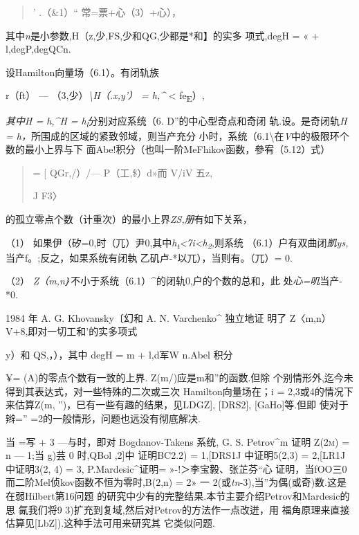 \documentclass{article}
\begin{document}
\begin{quote}
' .（\&1）`` 常=票+心（3）+心），
\end{quote}

其中\emph{n}是小参数,H（z,少,FS,少和QG,少都是*和】的实多 项式,degH = « +
l,degP,degQCn.

设Hamilton向量场（6.1）。有闭轨族

r（ft） --- （3,少）\emph{\textbackslash{}H（.x,y'） = h,\^{}}
\textless{} fe\textsubscript{E}）,

\emph{其中H = h,\^{}H = h\textsubscript{l}}分别对应系统（6.
D''的中心型奇点和奇闭 轨.设。是奇闭轨\emph{H =
h，}所围成的区域的紧致邻域，则当产充分
小时，系统（6.1\textbackslash{}在\emph{V}中的极限环个数的最小上界与下
面Abe!积分（也叫一阶MeFhikov函数，參宥（5.12）式）

\begin{quote}
= {[} QGr,/）/--- P（工,\$）d»而 V/iV 五z,

J F3〉
\end{quote}

的孤立零点个数（计重次）的最小上界\emph{ZS,册}有如下关系，

（1）
如果伊（矽=0,时（兀）尹0,其中\emph{h\textsubscript{t}\textless{}7i\textless{}h\textsubscript{2},}则系统
（6.1）户有双曲闭\emph{凱ys,}当产f。;反之，如果系统有闭執
乙矶卢-*以兀），当则有。（兀）= 0.

（2） \emph{Z（m,n｝}不小于系统（6.1）\^{}的闭轨0,户的个数的总和，此
处\emph{心=叽}当产-*0.

1984 年 A. G. Khovansky〔幻和 A. N. Varchenko\^{} 独立地证 明了 Z〈m,n）
V+8,即对一切工和'的实多项式

y）和 QS,，），其中 degH = m + l,d军W n.Abel 积分

¥= (A)的零点个数有一致的上界. Z(m/)应是m和''的函数.但除
个别情形外,迄今未得到其表达式，对一些特殊的二次或三次
Hamilton向量场在；i = 2,3或4的情况下来估算Z(m,
'')，巳有一些有趣的结果，见LDGZ{]}, {[}DRS2{]}, {[}GaHo{]}等.但即
使对于辫='' =2的一般情形，问题也远没有彻底解决.

当 =写 + 3 ---与时，即对 Bogdanov-Takens 系统, G. S. Petrov\^{}m 证明
\textsc{Z(2m)} = n --- 1;当 g)芸 0 时,QBol ,2{]}中 证明BC2.2) =
1,{[}DRS1J 中证明5(2,3) = 2,{[}LR1J 中证明3(2, 4) = 3,
P.Mardesic\^{}证明= »-!＞李宝毅、张芷芬``心
证明，当fOO三0而二阶Mel侦kov函数不恒为零时,B(2,n) = 2» 一
2(或\emph{tn}-3),当''为偶(或奇)数.这是在弱Hilbert第16问题
的研究中少有的完整结果.本节主要介绍Petrov和Mardesic的思 氤我们将9
3)扩充到复域,然后对Petrov的方法作一点改迸，用
福角原理来直接估算见{[}LbZ{]}).这种手法可用来研究其 它类似问题.
\end{document}
